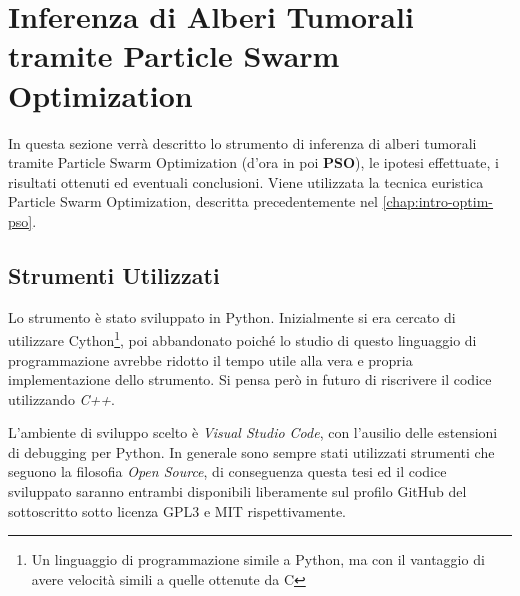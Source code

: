 \chapter{Inferenza di Alberi Tumorali tramite Particle Swarm Optimization}
\label{chap:pso}
In questa sezione verrà descritto lo strumento di inferenza di alberi tumorali tramite Particle Swarm Optimization (d'ora in poi \textbf{PSO}), le ipotesi effettuate, i risultati ottenuti ed eventuali conclusioni. Viene utilizzata la tecnica euristica Particle Swarm Optimization, descritta precedentemente nel \autoref{chap:intro-optim-pso}.

\section{Strumenti Utilizzati}
Lo strumento è stato sviluppato in Python. Inizialmente si era cercato di utilizzare Cython\footnote{Un linguaggio di programmazione simile a Python, ma con il vantaggio di avere velocità simili a quelle ottenute da C}, poi abbandonato poiché lo studio di questo linguaggio di programmazione avrebbe ridotto il tempo utile alla vera e propria implementazione dello strumento. Si pensa però in futuro di riscrivere il codice utilizzando \textit{C++}.

L'ambiente di sviluppo scelto è \textit{Visual Studio Code}, con l'ausilio delle estensioni di debugging per Python. In generale sono sempre stati utilizzati strumenti che seguono la filosofia \textit{Open Source}, di conseguenza questa tesi ed il codice sviluppato saranno entrambi disponibili liberamente sul profilo GitHub \cite{mygithub} del sottoscritto sotto licenza GPL3 e MIT rispettivamente.

